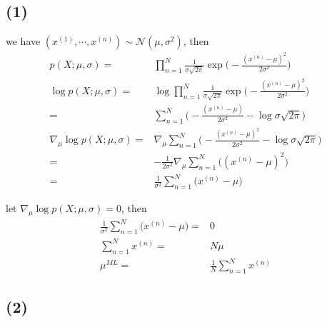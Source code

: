 \documentclass[../main.tex]{subfiles}
\begin{document}
\subsection*{(1)}

we have
$(x^{(1)}, \cdots, x^{(n)}) \sim \mathcal{N}(\mu, \sigma^2)$,
then
\begin{align*}
    p(X; \mu, \sigma)
    = & \prod^N_{n=1} \frac{1}{\sigma \sqrt{2 \pi}}
        \exp \big(
            - \frac{(x^{(n)} - \mu)^2}{2 \sigma^2}
        \big) \\
    \log p(X; \mu, \sigma)
    = & \log \prod^N_{n=1} \frac{1}{\sigma \sqrt{2 \pi}}
        \exp \big(
            - \frac{(x^{(n)} - \mu)^2}{2 \sigma^2}
        \big) \\
    = & \sum^N_{n=1} \big(
            - \frac{(x^{(n)}-\mu)}{2 \sigma^2}
            - \log \sigma \sqrt{2 \pi}
        \big) \\
    \nabla_\mu \log p(X; \mu, \sigma)
    = & \nabla_\mu \sum^N_{n=1} \big(
            - \frac{(x^{(n)}-\mu)^2}{2 \sigma^2}
            - \log \sigma \sqrt{2 \pi}
        \big) \\
    = & - \frac{1}{2 \sigma^2} \nabla_\mu
        \sum^N_{n=1} \big(
            (x^{(n)}-\mu)^2
        \big) \\
    = & \frac{1}{\sigma^2}
        \sum^N_{n=1}\big(x^{(n)} - \mu\big)
\end{align*}

let
$\nabla_\mu \log p(X; \mu, \sigma) = 0$,
then
\begin{align*}
    \frac{1}{\sigma^2}
    \sum^N_{n=1}\big(x^{(n)} - \mu\big)
    = & 0 \\
    \sum^N_{n=1}x^{(n)}
    = & N \mu \\
    \mu^{ML}
    = & \frac{1}{N}\sum^N_{n=1}x^{(n)}
\end{align*}

\subsection*{(2)}
\end{document}

